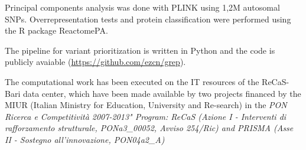 Principal components analysis was done with PLINK\cite{chang2015second} using 1,2M autosomal SNPs. 
Overrepresentation tests and protein classification were performed using the R package ReactomePA\cite{yu2016reactomepa}.  


The \gp pipeline for variant prioritization is written in Python and the code is publicly avaiable (\url{https://github.com/ezcn/grep}). 


The computational work has been executed on the IT resources of the ReCaS-Bari data center, which have been made available by two projects financed by the MIUR (Italian Ministry for Education, University and Re-search) in the \textit{PON Ricerca e Competitività 2007-2013" Program: ReCaS (Azione I - Interventi di rafforzamento strutturale, PONa3\_00052, Avviso 254/Ric) and PRISMA (Asse II - Sostegno all'innovazione, PON04a2\_A)}





